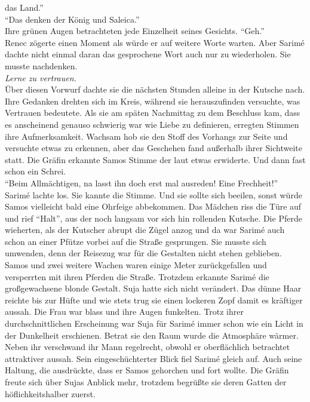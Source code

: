 das Land.''\\
``Das denken der König und Saleica.''\\
Ihre grünen Augen betrachteten jede Einzelheit seines Gesichts. ``Geh.'' \\
Renec zögerte einen Moment als würde er auf weitere Worte warten. Aber Sarimé dachte nicht einmal 
daran das gesprochene Wort auch nur zu wiederholen. Sie musste nachdenken.\\
\textit{Lerne zu vertrauen.}\\
Über diesen Vorwurf dachte sie die nächsten Stunden alleine in der Kutsche nach. Ihre Gedanken 
drehten sich im Kreis, während sie herauszufinden versuchte, was Vertrauen bedeutete. Als sie am 
späten Nachmittag zu dem Beschluss kam, dass es anscheinend genauso schwierig war wie Liebe zu 
definieren, erregten Stimmen ihre Aufmerksamkeit. Wachsam hob sie den Stoff des Vorhangs zur Seite 
und versuchte etwas zu erkennen, aber das Geschehen fand außerhalb ihrer Sichtweite statt. Die 
Gräfin erkannte Samos Stimme der laut etwas erwiderte. Und dann fast schon ein Schrei.\\
``Beim Allmächtigen, na lasst ihn doch erst mal ausreden! Eine Frechheit!''\\
Sarimé lachte los. Sie kannte die Stimme. Und sie sollte sich beeilen, sonst würde Samos vielleicht 
bald eine Ohrfeige abbekommen. Das Mädchen riss die Türe auf und rief ``Halt'', aus der noch 
langsam vor sich hin rollenden Kutsche. Die Pferde wieherten, als der Kutscher abrupt die Zügel 
anzog und da war Sarimé auch schon an einer Pfütze vorbei auf die Straße gesprungen. Sie musste sich 
umwenden, denn der Reisezug war für die Gestalten nicht stehen geblieben. Samos und zwei weitere 
Wachen waren einige Meter zurückgefallen und versperrten mit ihren Pferden die Straße. Trotzdem 
erkannte Sarimé die großgewachsene blonde Gestalt. Suja hatte sich nicht verändert. Das dünne Haar 
reichte bis zur Hüfte und wie stets trug sie einen lockeren Zopf damit es kräftiger aussah. Die Frau 
war blass und ihre Augen funkelten. Trotz ihrer durchschnittlichen Erscheinung war Suja für Sarimé 
immer schon wie ein Licht in der Dunkelheit erschienen. Betrat sie den Raum wurde die Atmosphäre 
wärmer. Neben ihr verschwand ihr Mann regelrecht, obwohl er oberflächlich betrachtet attraktiver 
aussah. Sein eingeschüchterter Blick fiel Sarimé gleich auf. Auch seine Haltung, die ausdrückte, 
dass er Samos gehorchen und fort wollte. Die Gräfin freute sich über Sujas Anblick mehr, trotzdem 
begrüßte sie deren Gatten der höflichkeitshalber zuerst. \\
